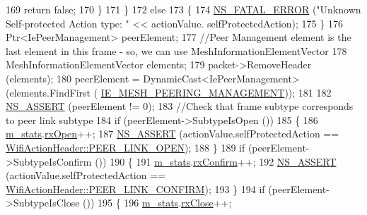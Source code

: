 \begin{DoxyCode}
169               \textcolor{keywordflow}{return} \textcolor{keyword}{false};
170             \}
171         \}
172       \textcolor{keywordflow}{else}
173         \{
174           \hyperlink{group__fatal_ga5131d5e3f75d7d4cbfd706ac456fdc85}{NS\_FATAL\_ERROR} (\textcolor{stringliteral}{"Unknown Self-protected Action type: "} << actionValue.
      selfProtectedAction);
175         \}
176       Ptr<IePeerManagement> peerElement;
177       \textcolor{comment}{//Peer Management element is the last element in this frame - so, we can use
       MeshInformationElementVector}
178       MeshInformationElementVector elements;
179       packet->RemoveHeader (elements);
180       peerElement = DynamicCast<IePeerManagement>(elements.FindFirst (
      \hyperlink{wifi-information-element_8h_ac165cb06d15fc79753f1bdcc8ac6b734}{IE\_MESH\_PEERING\_MANAGEMENT}));
181 
182       \hyperlink{assert_8h_a6dccdb0de9b252f60088ce281c49d052}{NS\_ASSERT} (peerElement != 0);
183       \textcolor{comment}{//Check that frame subtype corresponds to peer link subtype}
184       \textcolor{keywordflow}{if} (peerElement->SubtypeIsOpen ())
185         \{
186           \hyperlink{classns3_1_1dot11s_1_1PeerManagementProtocolMac_aaaccd87941623a8bff20e8998908b518}{m\_stats}.\hyperlink{structns3_1_1dot11s_1_1PeerManagementProtocolMac_1_1Statistics_aade324d2b21b1f3cd47e95dd6057a1eb}{rxOpen}++;
187           \hyperlink{assert_8h_a6dccdb0de9b252f60088ce281c49d052}{NS\_ASSERT} (actionValue.selfProtectedAction == 
      \hyperlink{classns3_1_1WifiActionHeader_a17cfd6c8f685a44e7b7b832cc9a53e83a5d1c8a5ef38c884f951cfe32e03ca572}{WifiActionHeader::PEER\_LINK\_OPEN});
188         \}
189       \textcolor{keywordflow}{if} (peerElement->SubtypeIsConfirm ())
190         \{
191           \hyperlink{classns3_1_1dot11s_1_1PeerManagementProtocolMac_aaaccd87941623a8bff20e8998908b518}{m\_stats}.\hyperlink{structns3_1_1dot11s_1_1PeerManagementProtocolMac_1_1Statistics_a6e0fcebfd07b428ac04e6a81ecf9fc77}{rxConfirm}++;
192           \hyperlink{assert_8h_a6dccdb0de9b252f60088ce281c49d052}{NS\_ASSERT} (actionValue.selfProtectedAction == 
      \hyperlink{classns3_1_1WifiActionHeader_a17cfd6c8f685a44e7b7b832cc9a53e83a89961b879d58204ada067ee8dbbde06e}{WifiActionHeader::PEER\_LINK\_CONFIRM}); 
193         \}
194       \textcolor{keywordflow}{if} (peerElement->SubtypeIsClose ())
195         \{
196           \hyperlink{classns3_1_1dot11s_1_1PeerManagementProtocolMac_aaaccd87941623a8bff20e8998908b518}{m\_stats}.\hyperlink{structns3_1_1dot11s_1_1PeerManagementProtocolMac_1_1Statistics_a6f248487a20fb8294d3eb5357f1680e3}{rxClose}++;

\end{DoxyCode}
